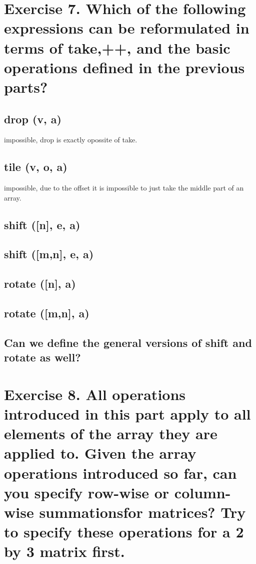 \documentclass[a4paper]{article}
\begin{document}
\section*{Exercise 7. Which of the following expressions can be reformulated in terms of take,++, and the basic operations defined in the previous parts?}
\subsection*{drop (v, a)}
impossible, drop is exactly opossite of take.
\subsection*{tile (v, o, a)}
impossible, due to the offset it is impossible to just take the middle part of an array.
\subsection*{shift ([n], e, a)}
\subsection*{shift ([m,n], e, a)}
\subsection*{rotate ([n], a)}
\subsection*{rotate ([m,n], a)}
\subsection*{Can we define the general versions of shift and rotate as well?}
\section*{Exercise 8. All operations introduced in this part apply to all elements of the array they are applied to. Given the array operations introduced so far, can you specify row-wise or column-wise summationsfor matrices? Try to specify these operations for a 2 by 3 matrix first.}
\end{document}
